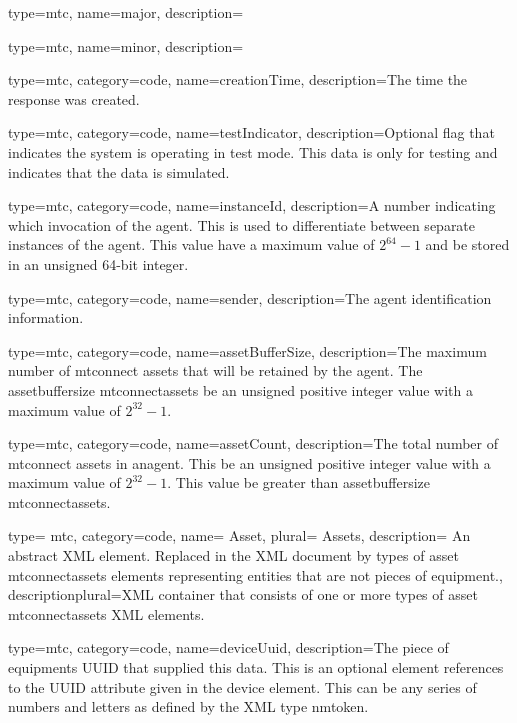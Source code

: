 {
  type=mtc,
  name={major},
  description={}
}


{
  type=mtc,
  name={minor},
  description={}
}


{
  type=mtc,
  category=code,
  name={creationTime},
  description={The time the response was created. }
}


{
  type=mtc,
  category=code,
  name={testIndicator},
  description={Optional flag that indicates the system is operating in test mode. This data is only for testing and indicates that the data is simulated. }
}


{
  type=mtc,
  category=code,
  name={instanceId},
  description={A number indicating which invocation of the \gls{agent}. This is used to differentiate between separate instances of the \gls{agent}. This value \MUST have a maximum value of $2^{64}-1$ and \MUST be stored in an unsigned 64-bit integer. }
}


{
  type=mtc,
  category=code,
  name={sender},
  description={The \gls{agent} identification information. }
}


{
  type=mtc,
  category=code,
  name={assetBufferSize},
  description={The maximum number of \glspl{mtconnect asset} that will be retained by the \gls{agent}. The \gls{assetbuffersize mtconnectassets} \MUST be an unsigned positive integer value with a maximum value of $2^{32}-1$. }
}


{
  type=mtc,
  category=code,
  name={assetCount},
  description={The total number of \glspl{mtconnect asset} in an\gls{agent}. This \MUST be an unsigned positive integer value with a maximum value of $2^{32}-1$. This value \MUSTNOT be greater than \gls{assetbuffersize mtconnectassets}.}
}


{
  type= mtc,
  category=code,
  name= {Asset},
  plural= {Assets},
  description= {An abstract XML element. Replaced in the XML document by types of \gls{asset mtconnectassets} elements representing entities that are not pieces of equipment.},
  descriptionplural={XML container that consists of one or more types of \gls{asset mtconnectassets} XML elements. }
}


{
  type=mtc,
  category=code,
  name={deviceUuid},
  description={The piece of equipments UUID that supplied this data. This is an optional element references to the UUID attribute given in the \gls{device} element. This can be any series of numbers and letters as defined by the XML type \gls{nmtoken}.}
}


